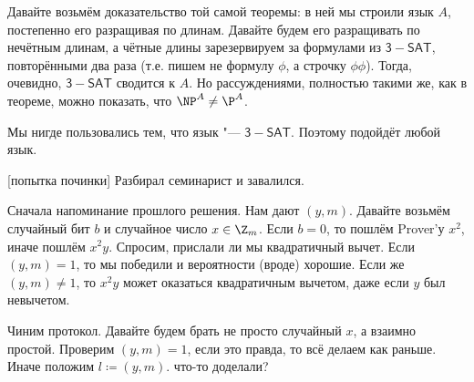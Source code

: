 	Давайте возьмём доказательство той самой теоремы: в ней мы строили язык $A$,
	постепенно его разращивая по длинам.
	Давайте будем его разращивать по нечётным длинам, а чётные длины зарезервируем
	за формулами из $\mathsf{3-SAT}$, повторёнными два раза (т.е. пишем не формулу $\phi$,
	а строчку $\phi\phi$).
	Тогда, очевидно, $\mathsf{3-SAT}$ сводится к $A$.
	Но рассуждениями, полностью такими же, как в теореме, можно показать, что $\NP^A \neq \P^A$.
	\begin{Rem}
		Мы нигде пользовались тем, что язык "--- $\mathsf{3-SAT}$.
		Поэтому подойдёт любой язык.
	\end{Rem}

[попытка починки]
	Разбирал семинарист и завалился.

	Сначала напоминание прошлого решения.
	Нам дают $(y, m)$.
	Давайте возьмём случайный бит $b$ и случайное число $x \in \Z_m$.
	Если $b=0$, то пошлём Prover'у $x^2$, иначе пошлём $x^2y$.
	Спросим, прислали ли мы квадратичный вычет.
	Если $(y, m) = 1$, то мы победили и вероятности (вроде) хорошие.
	Если же $(y, m) \neq 1$, то $x^2y$ может оказаться квадратичным вычетом, даже если $y$ был невычетом.

	Чиним протокол.
	Давайте будем брать не просто случайный $x$, а взаимно простой.
	Проверим $(y, m)=1$, если это правда, то всё делаем как раньше.
	Иначе положим $l\coloneq (y, m)$.
	\TODO что-то доделали?
